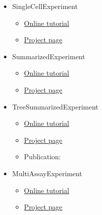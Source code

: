 \documentclass[
]{book}
\providecommand{\tightlist}{%
  \setlength{\itemsep}{0pt}\setlength{\parskip}{0pt}}
\begin{document}
\begin{itemize}
\tightlist
\item
  SingleCellExperiment \citep{R_SingleCellExperiment}

  \begin{itemize}
  \tightlist
  \item
    \href{https://bioconductor.org/packages/release/bioc/vignettes/SingleCellExperiment/inst/doc/intro.html}{Online tutorial}
  \item
    \href{https://bioconductor.org/packages/release/bioc/html/SingleCellExperiment.html}{Project page}
  \end{itemize}
\item
  SummarizedExperiment \citep{R_SummarizedExperiment}

  \begin{itemize}
  \tightlist
  \item
    \href{https://bioconductor.org/packages/release/bioc/vignettes/SummarizedExperiment/inst/doc/SummarizedExperiment.html}{Online tutorial}
  \item
    \href{https://bioconductor.org/packages/release/bioc/html/SummarizedExperiment.html}{Project page}
  \end{itemize}
\item
  TreeSummarizedExperiment \citep{R_TreeSummarizedExperiment}

  \begin{itemize}
  \tightlist
  \item
    \href{https://bioconductor.org/packages/release/bioc/vignettes/TreeSummarizedExperiment/inst/doc/Introduction_to_treeSummarizedExperiment.html}{Online tutorial}
  \item
    \href{https://www.bioconductor.org/packages/release/bioc/html/TreeSummarizedExperiment.html}{Project page}
  \item
    Publication: \citep{Huang2021}
  \end{itemize}
\item
  MultiAssayExperiment \citep{Ramos2017}

  \begin{itemize}
  \tightlist
  \item
    \href{https://www.bioconductor.org/packages/release/bioc/vignettes/MultiAssayExperiment/inst/doc/MultiAssayExperiment.html}{Online tutorial}
  \item
    \href{https://bioconductor.org/packages/release/bioc/html/MultiAssayExperiment.html}{Project page}
  \end{itemize}
\end{itemize}
\end{document}
